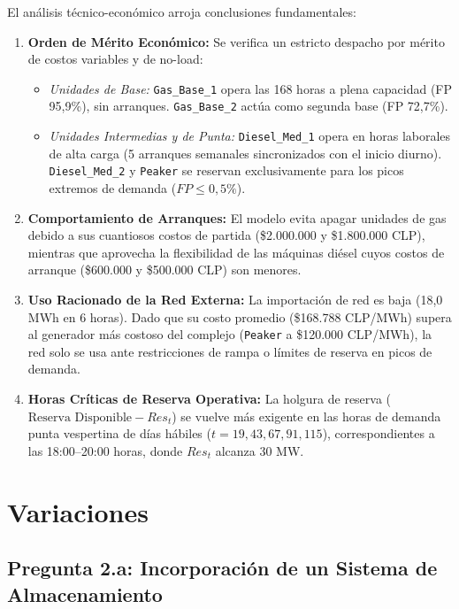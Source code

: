 \documentclass[10pt,letterpaper]{article}
\begin{document}
El análisis técnico-económico arroja conclusiones fundamentales:
\begin{enumerate}
    \item \textbf{Orden de Mérito Económico:} Se verifica un estricto despacho por mérito de costos variables y de no-load:
    \begin{itemize}
        \item \textit{Unidades de Base:} \texttt{Gas\_Base\_1} opera las 168 horas a plena capacidad (FP 95,9\%), sin arranques. \texttt{Gas\_Base\_2} actúa como segunda base (FP 72,7\%).
        \item \textit{Unidades Intermedias y de Punta:} \texttt{Diesel\_Med\_1} opera en horas laborales de alta carga (5 arranques semanales sincronizados con el inicio diurno). \texttt{Diesel\_Med\_2} y \texttt{Peaker} se reservan exclusivamente para los picos extremos de demanda ($FP \le 0,5\%$).
    \end{itemize}
    \item \textbf{Comportamiento de Arranques:} El modelo evita apagar unidades de gas debido a sus cuantiosos costos de partida (\$2.000.000 y \$1.800.000 CLP), mientras que aprovecha la flexibilidad de las máquinas diésel cuyos costos de arranque (\$600.000 y \$500.000 CLP) son menores.
    \item \textbf{Uso Racionado de la Red Externa:} La importación de red es baja (18,0 MWh en 6 horas). Dado que su costo promedio (\$168.788 CLP/MWh) supera al generador más costoso del complejo (\texttt{Peaker} a \$120.000 CLP/MWh), la red solo se usa ante restricciones de rampa o límites de reserva en picos de demanda.
    \item \textbf{Horas Críticas de Reserva Operativa:} La holgura de reserva ($\text{Reserva Disponible} - Res_t$) se vuelve más exigente en las horas de demanda punta vespertina de días hábiles ($t = 19, 43, 67, 91, 115$), correspondientes a las 18:00--20:00 horas, donde $Res_t$ alcanza 30 MW.
\end{enumerate}

\section{Variaciones}
\label{sec:variaciones}

\subsection{Pregunta 2.a: Incorporación de un Sistema de Almacenamiento}
\label{subsec:2a}
\end{document}
